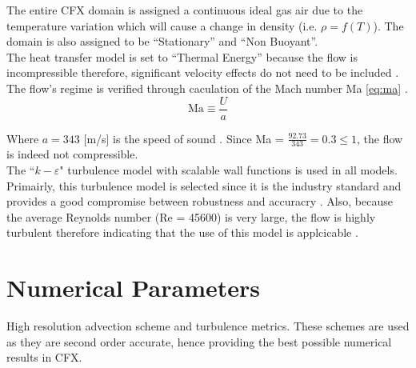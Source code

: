 The entire CFX domain is assigned a continuous ideal gas air due to the temperature variation which will cause a change in density (i.e. $\rho=f(T)$). The domain is also assigned to be ``Stationary'' and ``Non Buoyant''.\\

The heat transfer model is set to ``Thermal Energy'' because the flow is incompressible  therefore, significant velocity effects do not need to be included \cite{tut}. The flow's regime is verified through caculation of the Mach number Ma \ref{eq:ma} \cite{fluids}.
\begin{equation}
	\label{eq:ma}
	 \text{Ma}\equiv \frac{U}{a} 
\end{equation}

Where $a=343$ [m/s] is the speed of sound \cite{fluids}. Since Ma = $\tfrac{92.73}{343}=0.3 \leq 1$, the flow is indeed not compressible.\\

The ``$k-\varepsilon$" turbulence model with scalable wall functions is used in all models. Primairly, this turbulence model is selected since it is the industry standard and provides a good compromise between robustness and accuracry \cite{cfx}. Also, because the average Reynolds number (Re = 45600) is very large, the flow is highly turbulent therefore indicating that the use of this model is applcicable \cite{cfdbook}.

\section{Numerical Parameters}
\label{sec:pre_num}

High resolution advection scheme and turbulence metrics. These schemes are used as they are second order accurate, hence providing the best possible numerical results in CFX.\\

%
%
%
%
%

